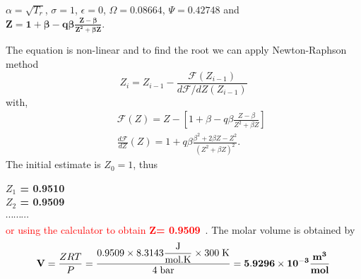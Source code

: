 \documentclass[calculator,steamtables,datasheet,solutions]{exam_newMarcus2}
\newcommand{\frc}{\displaystyle\frac}
\begin{document}
\begin{question}
\begin{enumerate}[(a)]
{$\alpha = \sqrt{T_{r}}$, $\sigma=1$, $\epsilon=0$, $\Omega=0.08664$, $\Psi=0.42748$ and \\ $\mathbf{Z = 1 + \beta - q\beta\frc{Z-\beta}{Z^{2}+\beta Z}}$.~

The equation is non-linear and to find the root we can apply Newton-Raphson method 
\begin{displaymath}
Z_{i} = Z_{i-1} - \frc{\mathcal{F}\left(Z_{i-1}\right)}{d\mathcal{F}/dZ \left(Z_{i-1}\right)}
\end{displaymath}
with,
\begin{eqnarray}
&& \mathcal{F}\left(Z\right) = Z - \left[ 1 + \beta - q\beta\frc{Z-\beta}{Z^{2}+\beta Z}\right] \nonumber \\
&& \frc{d\mathcal{F}}{dZ}\left(Z\right) = 1 + q\beta \frc{\beta^{2}+2\beta Z- Z^{2}}{\left(Z^{2}+\beta Z\right)^{2}}. \nonumber
\end{eqnarray} 
The initial estimate is $Z_{0}=1$, thus
\begin{center}
{\bf $Z_{1}$ = 0.9510}~ \\
{\bf $Z_{2}$ = 0.9509}~ \\
$\cdots \cdots \cdots $ \\
\textcolor{red} {or using the calculator to obtain $\mathbf{Z}${\bf = 0.9509}}~\solmarks{\textcolor{red}{5/12}}. The molar volume is obtained by~ 
\begin{displaymath}
    \mathbf{V} = \frc{Z R T}{P} = \frc{ 0.9509 \times 8.3143 \frc{\text{J}}{\text{mol.K}} \times 300\; \text{K}}{4\; \text{bar}} = \mathbf{5.9296\times 10^{-3}\frc{\text{\bf m}^{3}}{\text{\bf mol}}}
\end{displaymath}

\end{center}
} 
%
\end{enumerate}
%
\end{question}

\clearpage
\end{document}
